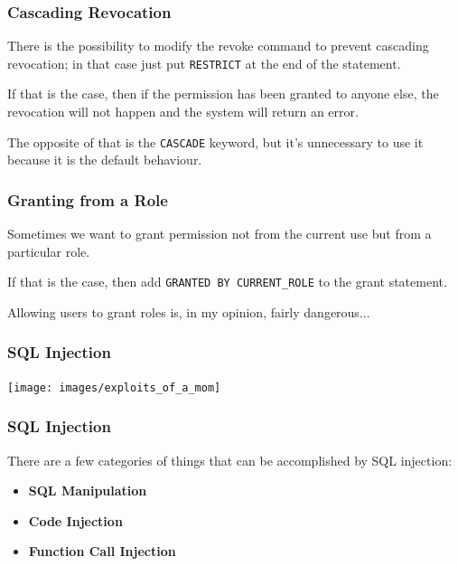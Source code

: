 \begin{frame}
\frametitle{Cascading Revocation}

There is the possibility to modify the revoke command to prevent cascading revocation; in that case just put \texttt{RESTRICT} at the end of the statement. 

If that is the case, then if the permission has been granted to anyone else, the revocation will not happen and the system will return an error.

The opposite of that is the \texttt{CASCADE} keyword, but it's unnecessary to use it because it is the default behaviour.

\end{frame}




\begin{frame}
\frametitle{Granting from a Role}

Sometimes we want to grant permission not from the current use but from a particular role.

 If that is the case, then add \texttt{GRANTED BY CURRENT\_ROLE} to the grant statement. 

Allowing users to grant roles is, in my opinion, fairly dangerous...

\end{frame}



\begin{frame}
\frametitle{SQL Injection}


\begin{center}
\texttt{[image: images/exploits\_of\_a\_mom]}
\end{center}

\end{frame}



\begin{frame}
\frametitle{SQL Injection}

There are a few categories of things that can be accomplished by SQL injection:

\begin{itemize}
	\item \textbf{SQL Manipulation}
	\item \textbf{Code Injection}
	\item \textbf{Function Call Injection}
\end{itemize}

\end{frame}

